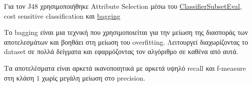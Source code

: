 Για τον J48 χρησιμοποιήθηκε Attribute Selection μέσω του
\href{http://weka.sourceforge.net/doc.stable/weka/attributeSelection/ClassifierSubsetEval.html}{ClassifierSubsetEval},
cost sensitive classification και
\href{https://en.wikipedia.org/wiki/Bootstrap_aggregating}{bagging}

Το bagging είναι μια τεχνική που χρησιμοποιείται για την μείωση της διασποράς των αποτελεσμάτων και βοηθάει στη μείωση του overfitting.
Λειτουργεί διαχωρίζοντας το dataset σε πολλά δείγματα και εφαρμόζοντας τον αλγόριθμο σε καθένα από αυτά.

Τα αποτελέσματα είναι αρκετά ικανοποιητικά με αρκετά υψηλό recall και f-measure στη κλάση $1$ χωρίς μεγάλη μείωση στο precision.